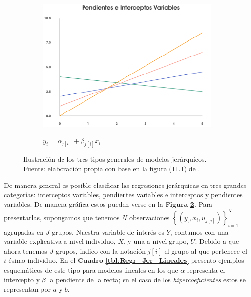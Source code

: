 \begin{figure}[h]
\begin{subfigure}{0.3\textwidth}
        \includegraphics[width=\textwidth]{Figs/Bayes/Pend_e_Inter_Variables}
        \label{fig:Ejemplos_Jer_Pend_Int_Var}
        \caption{$y_i = \alpha_{j[i]} + \beta_{j[i]} x_i$}
    \end{subfigure}
    \caption{Ilustración de los tres tipos generales de modelos jerárquicos. Fuente: elaboración propia con base en la figura (11.1) de \textcite{GelmanHill06}.}\label{fig:Ejemplos_Jer}
\end{figure}

De manera general es posible clasificar las regresiones jerárquicas en tres grandes categorías: interceptos variables, pendientes variables e interceptos y pendientes variables. De manera gráfica estos pueden verse en la \textbf{Figura \ref{fig:Ejemplos_Jer}}. Para presentarlas, supongamos que tenemos $N$ observaciones $\left\lbrace(y_i,x_i,u_{j[i]})\right\rbrace_{i=1}^{N}$ agrupadas en $J$ grupos. Nuestra variable de interés es $Y$, contamos con una variable explicativa a nivel individuo, $X$,  y una a nivel grupo,  $U$.  Debido a que ahora tenemos $J$ grupos, indico con la notación $j[i]$ el grupo al que pertenece el $i$-ésimo individuo. En el \textbf{Cuadro \ref{tbl:Regr_Jer_Lineales}} presento ejemplos esquemáticos de este tipo para modelos lineales en los que $\alpha$ representa el intercepto y $\beta$ la pendiente de la recta; en el caso de los \textit{hipercoeficientes} estos se representan por $a$ y $b$.\\

